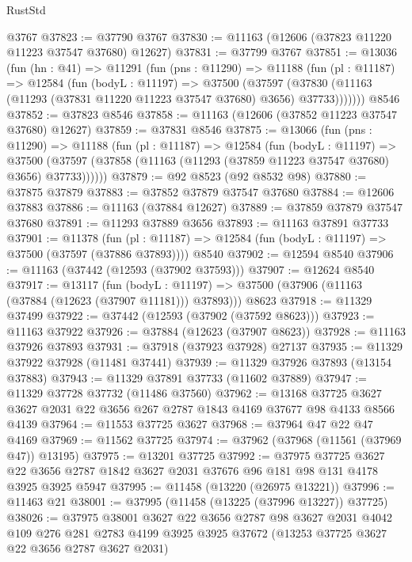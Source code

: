 \begin{lexlean}{RustStd}
\begin{coremodule}
    @3767
@37823 := @37790 @3767
@37830 := @11163 (@12606 (@37823 @11220 @11223 @37547 @37680) @12627)
@37831 := @37799 @3767
@37851 := @13036
    (fun (hn : @41) =>
    @11291
      (fun (pns : @11290) =>
      @11188
        (fun (pl : @11187) =>
        @12584
          (fun (bodyL : @11197) =>
          @37500
            (@37597
              (@37830 (@11163 (@11293 (@37831 @11220 @11223 @37547 @37680) @3656) @37733)))))))
    @8546
@37852 := @37823 @8546
@37858 := @11163 (@12606 (@37852 @11223 @37547 @37680) @12627)
@37859 := @37831 @8546
@37875 := @13066
    (fun (pns : @11290) =>
    @11188
      (fun (pl : @11187) =>
      @12584
        (fun (bodyL : @11197) =>
        @37500 (@37597 (@37858 (@11163 (@11293 (@37859 @11223 @37547 @37680) @3656) @37733))))))
@37879 := @92 @8523 (@92 @8532 @98)
@37880 := @37875 @37879
@37883 := @37852 @37879 @37547 @37680
@37884 := @12606 @37883
@37886 := @11163 (@37884 @12627)
@37889 := @37859 @37879 @37547 @37680
@37891 := @11293 @37889 @3656
@37893 := @11163 @37891 @37733
@37901 := @11378
    (fun (pl : @11187) => @12584 (fun (bodyL : @11197) => @37500 (@37597 (@37886 @37893))))
    @8540
@37902 := @12594 @8540
@37906 := @11163 (@37442 (@12593 (@37902 @37593)))
@37907 := @12624 @8540
@37917 := @13117
    (fun (bodyL : @11197) => @37500 (@37906 (@11163 (@37884 (@12623 (@37907 @11181))) @37893)))
    @8623
@37918 := @11329 @37499
@37922 := @37442 (@12593 (@37902 (@37592 @8623)))
@37923 := @11163 @37922
@37926 := @37884 (@12623 (@37907 @8623))
@37928 := @11163 @37926 @37893
@37931 := @37918 (@37923 @37928) @27137
@37935 := @11329 @37922 @37928 (@11481 @37441)
@37939 := @11329 @37926 @37893 (@13154 @37883)
@37943 := @11329 @37891 @37733 (@11602 @37889)
@37947 := @11329 @37728 @37732 (@11486 @37560)
@37962 := @13168
    @37725
    @3627
    @3627
    @2031
    @22
    @3656
    @267
    @2787
    @1843
    @4169
    @37677
    @98
    @4133
    @8566
    @4139
@37964 := @11553 @37725 @3627
@37968 := @37964 @47 @22 @47 @4169
@37969 := @11562 @37725
@37974 := @37962 (@37968 (@11561 (@37969 @47)) @13195)
@37975 := @13201 @37725
@37992 := @37975
    @37725
    @3627
    @22
    @3656
    @2787
    @1842
    @3627
    @2031
    @37676
    @96
    @181
    @98
    @131
    @4178
    @3925
    @3925
    @5947
@37995 := @11458 (@13220 (@26975 @13221))
@37996 := @11463 @21
@38001 := @37995 (@11458 (@13225 (@37996 @13227)) @37725)
@38026 := @37975
    @38001
    @3627
    @22
    @3656
    @2787
    @98
    @3627
    @2031
    @4042
    @109
    @276
    @281
    @2783
    @4199
    @3925
    @3925
    @37672
    (@13253 @37725 @3627 @22 @3656 @2787 @3627 @2031)

\end{coremodule}
\end{lexlean}

